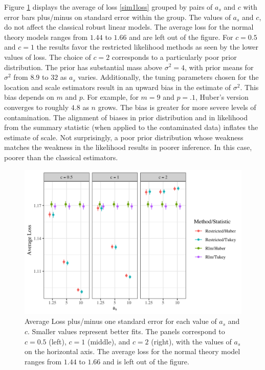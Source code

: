 \documentclass[ba]{imsart}
\begin{document}
Figure \ref{kl_sim} displays the average of loss \ref{sim1loss} grouped by pairs of $a_{s}$ and $c$ with error bars plus/minus on standard error within the group.  The values of $a_{s}$ and $c$, do not affect the classical robust linear models. The average loss for the normal theory models ranges from $1.44$ to $1.66$ and are left out of the figure. For $c = 0.5$ and $c = 1$ the results favor the restricted likelihood methods as seen by the lower values of loss. The choice of $c = 2$ corresponds to a particularly poor prior distribution.  The prior has substantial mass above $\sigma^{2} = 4$, with prior means for $\sigma^2$ from $8.9$ to $32$ as $a_s$ varies.  Additionally, the tuning parameters chosen for the location and scale estimators result in an upward bias in the estimate of $\sigma^{2}$. This bias depends on $m$ and $p$. For example, for $m = 9$ and $p = .1$, Huber's version converges to roughly $4.8$ as $n$ grows.  The bias is greater for more severe levels of contamination.  The alignment of biases in prior distribution and in likelihood from the summary statistic (when applied to the contaminated data) inflates the estimate of scale.  Not surprisingly, a poor prior distribution whose weakness matches the weakness in the likelihood results in poorer inference.  In this case, poorer than the classical estimators. 
 
\begin{figure}[t]
\centering
\includegraphics[width = 5in]{mse_sim2_facet_scale.png}
\caption{Average Loss plus/minus one standard error for each value of $a_{s}$ and $c$. Smaller values represent better fits. The panels correspond to $c = 0.5$ (left), $c=1$ (middle), and $c=2$ (right), with the values of $a_{s}$ on the horizontal axis. The average loss for the normal theory model ranges from $1.44$ to $1.66$ and is left out of the figure.}
\label{kl_sim}
\end{figure}
\end{document}

